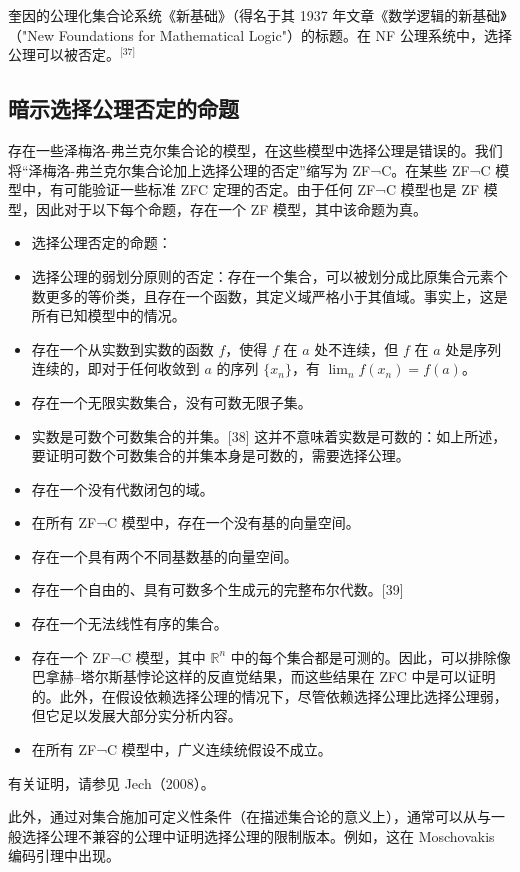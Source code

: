 奎因的公理化集合论系统《新基础》（得名于其 1937 年文章《数学逻辑的新基础》（"New Foundations for Mathematical Logic"）的标题。在 NF 公理系统中，选择公理可以被否定。\(^\text{[37]}\)
\subsection{暗示选择公理否定的命题}  
存在一些泽梅洛-弗兰克尔集合论的模型，在这些模型中选择公理是错误的。我们将“泽梅洛-弗兰克尔集合论加上选择公理的否定”缩写为 ZF¬C。在某些 ZF¬C 模型中，有可能验证一些标准 ZFC 定理的否定。由于任何 ZF¬C 模型也是 ZF 模型，因此对于以下每个命题，存在一个 ZF 模型，其中该命题为真。
\begin{itemize}
\item 选择公理否定的命题：  
\item 选择公理的弱划分原则的否定：存在一个集合，可以被划分成比原集合元素个数更多的等价类，且存在一个函数，其定义域严格小于其值域。事实上，这是所有已知模型中的情况。  
\item 存在一个从实数到实数的函数 \(f\)，使得 \(f\) 在 \(a\) 处不连续，但 \(f\) 在 \(a\) 处是序列连续的，即对于任何收敛到 \(a\) 的序列 \(\{x_n\}\)，有 \(\lim_{n} f(x_n) = f(a)\)。  
\item 存在一个无限实数集合，没有可数无限子集。  
\item 实数是可数个可数集合的并集。[38] 这并不意味着实数是可数的：如上所述，要证明可数个可数集合的并集本身是可数的，需要选择公理。  
\item 存在一个没有代数闭包的域。  
\item 在所有 ZF¬C 模型中，存在一个没有基的向量空间。  
\item 存在一个具有两个不同基数基的向量空间。  
\item 存在一个自由的、具有可数多个生成元的完整布尔代数。[39]  
\item 存在一个无法线性有序的集合。  
\item 存在一个 ZF¬C 模型，其中 \( \mathbb{R}^n \) 中的每个集合都是可测的。因此，可以排除像巴拿赫–塔尔斯基悖论这样的反直觉结果，而这些结果在 ZFC 中是可以证明的。此外，在假设依赖选择公理的情况下，尽管依赖选择公理比选择公理弱，但它足以发展大部分实分析内容。  
\item 在所有 ZF¬C 模型中，广义连续统假设不成立。  
\end{itemize}
有关证明，请参见 Jech（2008）。

此外，通过对集合施加可定义性条件（在描述集合论的意义上），通常可以从与一般选择公理不兼容的公理中证明选择公理的限制版本。例如，这在 Moschovakis 编码引理中出现。
